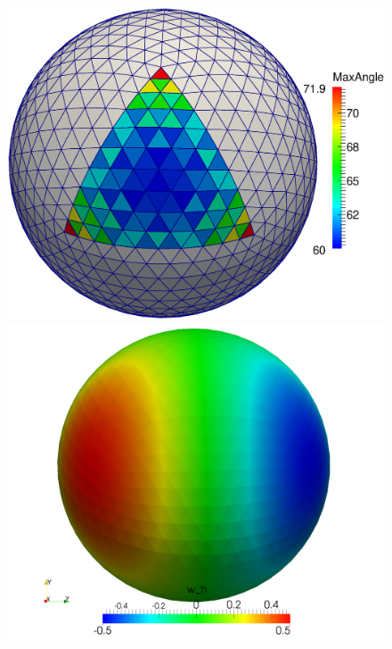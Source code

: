     \begin{figure}
      \begin{minipage}[t]{0.49\textwidth}
        \includegraphics[width=\textwidth]{bilder/laplaceSphere/mesh.eps}
      \end{minipage}
      \hfill
      \begin{minipage}[t]{0.49\textwidth}
        \includegraphics[width=\textwidth]{bilder/laplaceSphere/DECSol1k.png}
      \end{minipage}\\

\end{figure}
